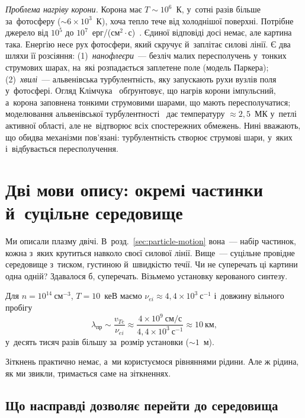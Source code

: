 \emph{Проблема нагріву корони.} Корона має $T\sim10^6$~К, у~сотні разів більше за~фотосферу ($\sim6\times10^3$~К), хоча тепло тече від холоднішої поверхні. Потрібне джерело
від $10^{5}$ до $10^{7}$~ерг/(см$^2\cdot$с)~\cite{withbroe1977mass}. Єдиної відповіді досі немає, але картина така. Енергію несе рух фотосфери, який скручує й~заплітає силові лінії.
Є два шляхи її розсіяння: (1)~\emph{нанофлеєри}~--- безліч малих пересполучень у~тонких струмових шарах, на~які розпадається заплетене поле (модель Паркера);
(2)~\emph{хвилі}~--- альвенівська турбулентність, яку запускають рухи вузлів поля у~фотосфері. Огляд Клімчука~\cite{klimchuk2015key} обґрунтовує, що нагрів корони імпульсний, а~корона заповнена
тонкими струмовими шарами, що мають пересполучатися; моделювання альвенівської турбулентності~\cite{vanballegooijen2017heating} дає температуру $\approx2{,}5$~МК
у~петлі активної області, але не~відтворює всіх спостережних обмежень. Нині вважають, що обидва механізми пов'язані: турбулентність створює струмові шари, у~яких і~відбувається пересполучення.


\section{Дві мови опису: окремі частинки й~суцільне середовище}\label{sec:two-descriptions}


Ми описали плазму двічі. В~розд.~\ref{sec:particle-motion} вона~--- набір частинок, кожна
з~яких крутиться навколо своєї силової лінії. Вище~--- суцільне провідне середовище
з~тиском, густиною й~швидкістю течії. Чи не суперечать ці картини одна одній? Здавалося б, суперечать. Візьмемо установку керованого синтезу.

\begin{Estimate}
Для $n=10^{14}~\mathrm{см}^{-3}$, $T=10$~кеВ маємо $\nu_{ei}\approx4{,}4\times10^{3}~\mathrm{с}^{-1}$ і~довжину вільного пробігу
\[
	\lambda_{\mathrm{пр}}\sim\frac{v_{Te}}{\nu_{ei}}\approx\frac{4\times10^{9}~\text{см/с}}{4{,}4\times10^{3}~\mathrm{с}^{-1}}\approx10~\text{км},
\]
у~десять тисяч разів більшу за~розмір установки ($\sim1$~м).
\end{Estimate}

Зіткнень практично немає, а~ми користуємося рівняннями рідини. Але ж рідина, як ми звикли, тримається саме на
зіткненнях.


\subsection*{Що насправді дозволяє перейти до середовища}
\makeatletter{}\makeatother
\label{sec:fluid-medium-basis}


